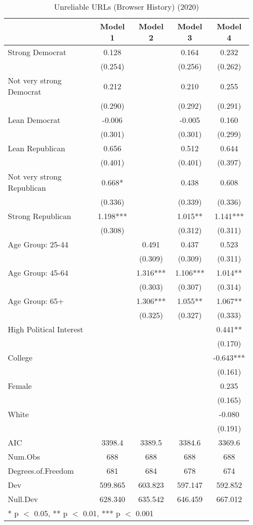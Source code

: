 \begin{table}

\caption{Unreliable URLs (Browser History) (2020)}
\centering
\begin{tabular}[t]{lcccc}
\toprule
  & Model 1 & Model 2 & Model 3 & Model 4\\
\midrule
Strong Democrat & 0.128 &  & 0.164 & 0.232\\
 & (0.254) &  & (0.256) & (0.262)\\
Not very strong Democrat & 0.212 &  & 0.210 & 0.255\\
 & (0.290) &  & (0.292) & (0.291)\\
Lean Democrat & -0.006 &  & -0.005 & 0.160\\
 & (0.301) &  & (0.301) & (0.299)\\
Lean Republican & 0.656 &  & 0.512 & 0.644\\
 & (0.401) &  & (0.401) & (0.397)\\
Not very strong Republican & 0.668* &  & 0.438 & 0.608\\
 & (0.336) &  & (0.339) & (0.336)\\
Strong Republican & 1.198*** &  & 1.015** & 1.141***\\
 & (0.308) &  & (0.312) & (0.311)\\
Age Group: 25-44 &  & 0.491 & 0.437 & 0.523\\
 &  & (0.309) & (0.309) & (0.311)\\
Age Group: 45-64 &  & 1.316*** & 1.106*** & 1.014**\\
 &  & (0.303) & (0.307) & (0.314)\\
Age Group: 65+ &  & 1.306*** & 1.055** & 1.067**\\
 &  & (0.325) & (0.327) & (0.333)\\
High Political Interest &  &  &  & 0.441**\\
 &  &  &  & (0.170)\\
College &  &  &  & -0.643***\\
 &  &  &  & (0.161)\\
Female &  &  &  & 0.235\\
 &  &  &  & (0.165)\\
White &  &  &  & -0.080\\
 &  &  &  & (0.191)\\
\midrule
AIC & 3398.4 & 3389.5 & 3384.6 & 3369.6\\
Num.Obs & 688 & 688 & 688 & 688\\
Degrees.of.Freedom & 681 & 684 & 678 & 674\\
Dev & 599.865 & 603.823 & 597.147 & 592.852\\
Null.Dev & 628.340 & 635.542 & 646.459 & 667.012\\
\bottomrule
\multicolumn{5}{l}{\rule{0pt}{1em}* p $<$ 0.05, ** p $<$ 0.01, *** p $<$ 0.001}\\
\end{tabular}
\end{table}
